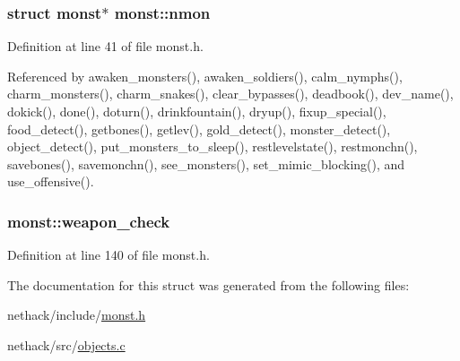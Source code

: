 \hypertarget{structmonst_a4c4bcdcf3c4ec4a85313ade9f9c27b72}{
\subsubsection[{nmon}]{\setlength{\rightskip}{0pt plus 5cm}struct {\bf monst}$\ast$ monst\+::nmon}}\label{structmonst_a4c4bcdcf3c4ec4a85313ade9f9c27b72}


Definition at line 41 of file monst.\+h.



Referenced by awaken\+\_\+monsters(), awaken\+\_\+soldiers(), calm\+\_\+nymphs(), charm\+\_\+monsters(), charm\+\_\+snakes(), clear\+\_\+bypasses(), deadbook(), dev\+\_\+name(), dokick(), done(), doturn(), drinkfountain(), dryup(), fixup\+\_\+special(), food\+\_\+detect(), getbones(), getlev(), gold\+\_\+detect(), monster\+\_\+detect(), object\+\_\+detect(), put\+\_\+monsters\+\_\+to\+\_\+sleep(), restlevelstate(), restmonchn(), savebones(), savemonchn(), see\+\_\+monsters(), set\+\_\+mimic\+\_\+blocking(), and use\+\_\+offensive().

\hypertarget{structmonst_a78c189917d1c1a53b6ac4fa2fb65611a}{
\subsubsection[{weapon\+\_\+check}]{ monst\+::weapon\+\_\+check}}\label{structmonst_a78c189917d1c1a53b6ac4fa2fb65611a}


Definition at line 140 of file monst.\+h.



The documentation for this struct was generated from the following files\+:\begin{DoxyCompactItemize}
\item 
nethack/include/\hyperlink{monst_8h}{monst.\+h}\item 
nethack/src/\hyperlink{objects_8c}{objects.\+c}\end{DoxyCompactItemize}
